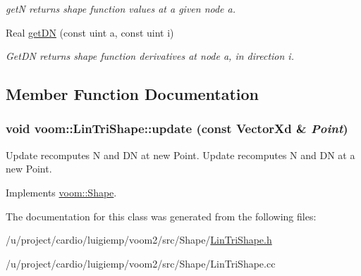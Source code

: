 \begin{DoxyCompactItemize}
\begin{DoxyCompactList}\small\item\em getN returns shape function values at a given node a. \item\end{DoxyCompactList}\item 
\hypertarget{classvoom_1_1_lin_tri_shape_a418e9f637c1178859d422308ef881df7}{
Real \hyperlink{classvoom_1_1_lin_tri_shape_a418e9f637c1178859d422308ef881df7}{getDN} (const uint a, const uint i)}
\label{classvoom_1_1_lin_tri_shape_a418e9f637c1178859d422308ef881df7}

\begin{DoxyCompactList}\small\item\em GetDN returns shape function derivatives at node a, in direction i. \item\end{DoxyCompactList}\end{DoxyCompactItemize}


\subsection{Member Function Documentation}
\hypertarget{classvoom_1_1_lin_tri_shape_a3802bf83a7e1ee9310bdb6d6558bd7ad}{
\subsubsection[{update}]{\setlength{\rightskip}{0pt plus 5cm}void voom::LinTriShape::update (const VectorXd \& {\em Point})}}
\label{classvoom_1_1_lin_tri_shape_a3802bf83a7e1ee9310bdb6d6558bd7ad}


Update recomputes N and DN at new Point. Update recomputes N and DN at a new Point. 

Implements \hyperlink{classvoom_1_1_shape_a8ded544de12647543b056cec61be9f26}{voom::Shape}.

The documentation for this class was generated from the following files:\begin{DoxyCompactItemize}
\item 
/u/project/cardio/luigiemp/voom2/src/Shape/\hyperlink{_lin_tri_shape_8h}{LinTriShape.h}\item 
/u/project/cardio/luigiemp/voom2/src/Shape/LinTriShape.cc\end{DoxyCompactItemize}
